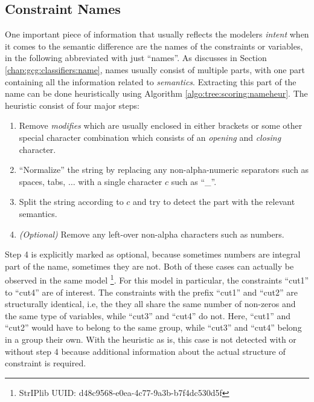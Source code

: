 		\clearpage

		\subsection{Constraint Names}
		\label{chap:tree:scoring:names}

			One important piece of information that usually reflects the modelers \textit{intent} when it comes to the semantic difference are the names of the constraints or variables, in the following abbreviated with just \enquote{names}.
			As discusses in Section \ref{chap:gcg:classifiers:name}, names usually consist of multiple parts, with one part containing all the information related to \textit{semantics}.
			Extracting this part of the name can be done heuristically using Algorithm \ref{algo:tree:scoring:nameheur}.
			The heuristic consist of four major steps:
			\begin{enumerate}
				\item Remove \textit{modifies} which are usually enclosed in either brackets or some other special character combination which consists of an \textit{opening} and \textit{closing} character.
				\item \enquote{Normalize} the string by replacing any non-alpha-numeric separators such as spaces, tabs, $\ldots$ with a single character $c$ such as \enquote{\_}.
				\item Split the string according to $c$ and try to detect the part with the relevant semantics.
				\item \textit{(Optional)} Remove any left-over non-alpha characters such as numbers.
			\end{enumerate}

			Step 4 is explicitly marked as optional, because sometimes numbers are integral part of the name, sometimes they are not.
			Both of these cases can actually be observed in the same model \footnote{StrIPlib UUID: d48c9568-e0ea-4c77-9a3b-b7f4dc530d5f}.
			For this model in particular, the constraints \enquote{cut1} to \enquote{cut4} are of interest.
			The constraints with the prefix \enquote{cut1} and \enquote{cut2} are structurally identical, i.e, the they all share the same number of non-zeros and the same type of variables, while \enquote{cut3} and \enquote{cut4} do not.
			Here, \enquote{cut1} and \enquote{cut2} would have to belong to the same group, while \enquote{cut3} and \enquote{cut4} belong in a group their own.
			With the heuristic as is, this case is not detected with or without step 4 because additional information about the actual structure of constraint is required.

